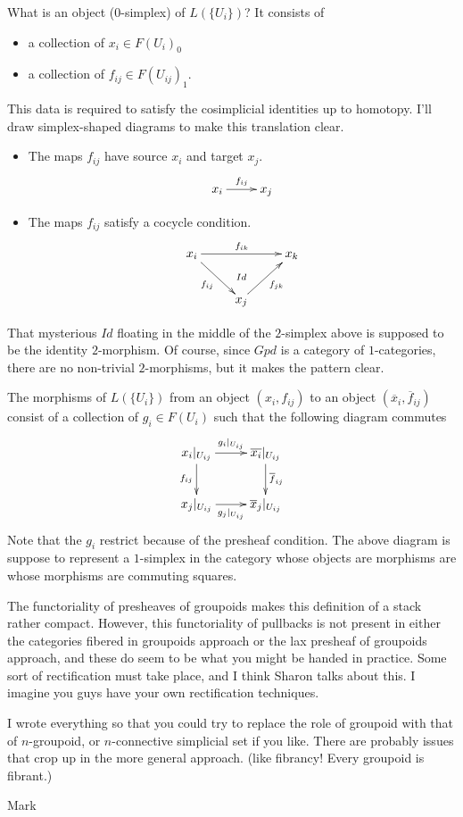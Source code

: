 \medskip\noindent
What is an object ($0$-simplex) of $L(\{U_i\})$?  It consists of
\begin{itemize}
\item a collection of $x_i \in F(U_i)_0$
\item a collection of $f_{ij} \in F(U_{ij})_1$.
\end{itemize}
This data is required to satisfy the cosimplicial identities up to
homotopy.  I'll draw simplex-shaped diagrams to make this translation
clear.
\begin{itemize}
\item The maps $f_{ij}$ have source $x_i$ and target $x_j$.
$$
\xymatrix{
x_i \ar[r]^{f_{ij}} & x_j
}
$$
\item The maps $f_{ij}$ satisfy a cocycle condition.
$$
\xymatrix{
x_i \ar[rr]^{f_{ik}} \ar[rd]_{f_{ij}} & \ar@{}[d]|{Id} & x_k
\\
& x_j \ar[ru]_{f_{jk}}
}
$$
\end{itemize}
That mysterious $Id$ floating in the middle of the $2$-simplex above is
supposed to be the identity $2$-morphism. Of course, since $\textit{Gpd}$ is a
category of $1$-categories, there are no non-trivial $2$-morphisms, but it
makes the pattern clear.

\medskip\noindent
The morphisms of $L(\{U_i\})$ from an object $(x_i, f_{ij})$ to an object
$(\overline{x}_i, \overline{f}_{ij})$ consist of a collection of
$g_i \in F(U_i)$ such that the following diagram commutes
$$
\xymatrix{
x_i\vert_{U_{ij}} \ar[r]^{g_i\vert_{U_{ij}}} \ar[d]_{f_{ij}} &
\overline{x_i}\vert_{U_{ij}} \ar[d]^{\overline{f}_{ij}}
\\
x_j\vert_{U_{ij}} \ar[r]_{g_j\vert_{U_{ij}}} &
\overline{x}_j\vert_{U_{ij}}
}
$$
Note that the $g_i$ restrict because of the presheaf condition.  The above
diagram is suppose to represent a $1$-simplex in the category whose objects
are morphisms are whose morphisms are commuting squares.

\medskip\noindent
The functoriality of presheaves of groupoids makes this definition of a
stack rather
compact.  However, this functoriality of pullbacks is not present in either
the categories fibered in groupoids approach or the lax presheaf of
groupoids approach, and these do seem to be what you might be handed in
practice.  Some sort of rectification must take place, and I think Sharon
talks about this.  I imagine you guys have your own rectification
techniques.

\medskip\noindent
I wrote everything so that you could try to replace the role of groupoid
with that of $n$-groupoid, or $n$-connective simplicial set if you like.
There are probably issues that crop up in the more general approach. (like
fibrancy!  Every groupoid is fibrant.)

\medskip\noindent
Mark








